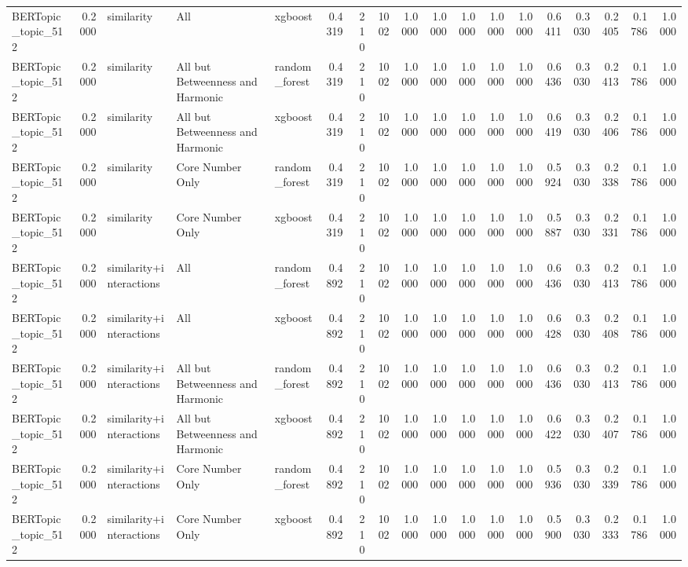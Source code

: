 \begin{tabular}{lrlllrrrrrrrrrrrrr}
BERTopic_topic_512 & 0.2000 & similarity & All & xgboost & 0.4319 & 210 & 1002 & 1.0000 & 1.0000 & 1.0000 & 1.0000 & 1.0000 & 0.6411 & 0.3030 & 0.2405 & 0.1786 & 1.0000 \\
BERTopic_topic_512 & 0.2000 & similarity & All but Betweenness and Harmonic & random_forest & 0.4319 & 210 & 1002 & 1.0000 & 1.0000 & 1.0000 & 1.0000 & 1.0000 & 0.6436 & 0.3030 & 0.2413 & 0.1786 & 1.0000 \\
BERTopic_topic_512 & 0.2000 & similarity & All but Betweenness and Harmonic & xgboost & 0.4319 & 210 & 1002 & 1.0000 & 1.0000 & 1.0000 & 1.0000 & 1.0000 & 0.6419 & 0.3030 & 0.2406 & 0.1786 & 1.0000 \\
BERTopic_topic_512 & 0.2000 & similarity & Core Number Only & random_forest & 0.4319 & 210 & 1002 & 1.0000 & 1.0000 & 1.0000 & 1.0000 & 1.0000 & 0.5924 & 0.3030 & 0.2338 & 0.1786 & 1.0000 \\
BERTopic_topic_512 & 0.2000 & similarity & Core Number Only & xgboost & 0.4319 & 210 & 1002 & 1.0000 & 1.0000 & 1.0000 & 1.0000 & 1.0000 & 0.5887 & 0.3030 & 0.2331 & 0.1786 & 1.0000 \\
BERTopic_topic_512 & 0.2000 & similarity+interactions & All & random_forest & 0.4892 & 210 & 1002 & 1.0000 & 1.0000 & 1.0000 & 1.0000 & 1.0000 & 0.6436 & 0.3030 & 0.2413 & 0.1786 & 1.0000 \\
BERTopic_topic_512 & 0.2000 & similarity+interactions & All & xgboost & 0.4892 & 210 & 1002 & 1.0000 & 1.0000 & 1.0000 & 1.0000 & 1.0000 & 0.6428 & 0.3030 & 0.2408 & 0.1786 & 1.0000 \\
BERTopic_topic_512 & 0.2000 & similarity+interactions & All but Betweenness and Harmonic & random_forest & 0.4892 & 210 & 1002 & 1.0000 & 1.0000 & 1.0000 & 1.0000 & 1.0000 & 0.6436 & 0.3030 & 0.2413 & 0.1786 & 1.0000 \\
BERTopic_topic_512 & 0.2000 & similarity+interactions & All but Betweenness and Harmonic & xgboost & 0.4892 & 210 & 1002 & 1.0000 & 1.0000 & 1.0000 & 1.0000 & 1.0000 & 0.6422 & 0.3030 & 0.2407 & 0.1786 & 1.0000 \\
BERTopic_topic_512 & 0.2000 & similarity+interactions & Core Number Only & random_forest & 0.4892 & 210 & 1002 & 1.0000 & 1.0000 & 1.0000 & 1.0000 & 1.0000 & 0.5936 & 0.3030 & 0.2339 & 0.1786 & 1.0000 \\
BERTopic_topic_512 & 0.2000 & similarity+interactions & Core Number Only & xgboost & 0.4892 & 210 & 1002 & 1.0000 & 1.0000 & 1.0000 & 1.0000 & 1.0000 & 0.5900 & 0.3030 & 0.2333 & 0.1786 & 1.0000 \\

\end{tabular}
